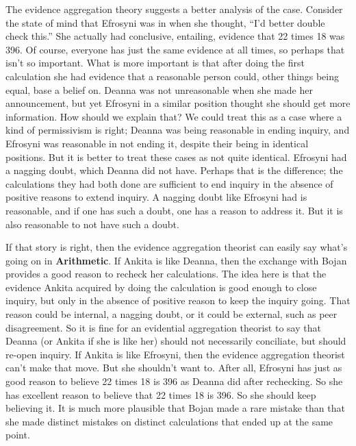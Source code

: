 The evidence aggregation theory suggests a better analysis of the case. Consider the state of mind that \gls{Efrosyni} was in when she thought, ``I'd better double check this.'' She actually had conclusive, entailing, evidence that 22 times 18 was 396. Of course, everyone has just the same evidence at all times, so perhaps that isn't so important. What is more important is that after doing the first calculation she had evidence that a reasonable person could, other things being equal, base a belief on. \gls{Deanna} was not unreasonable when she made her announcement, but yet \gls{Efrosyni} in a similar position thought she should get more information. How should we explain that? We could treat this as a case where a kind of permissivism is right; \gls{Deanna} was being reasonable in ending inquiry, and \gls{Efrosyni} was reasonable in not ending it, despite their being in identical positions. But it is better to treat these cases as not quite identical. \gls{Efrosyni} had a nagging doubt, which \gls{Deanna} did not have. Perhaps that is the difference; the calculations they had both done are sufficient to end inquiry in the absence of positive reasons to extend inquiry. A nagging doubt like \gls{Efrosyni} had is reasonable, and if one has such a doubt, one has a reason to address it. But it is also reasonable to not have such a doubt.

If that story is right, then the evidence aggregation theorist can easily say what's going on in \textbf{Arithmetic}. If \gls{Ankita} is like \gls{Deanna}, then the exchange with \gls{Bojan} provides a good reason to recheck her calculations. The idea here is that the evidence \gls{Ankita} acquired by doing the calculation is good enough to close inquiry, but only in the absence of positive reason to keep the inquiry going. That reason could be internal, a nagging doubt, or it could be external, such as peer disagreement. So it is fine for an evidential aggregation theorist to say that \gls{Deanna} (or Ankita if she is like her) should not necessarily conciliate, but should re-open inquiry. If \gls{Ankita} is like \gls{Efrosyni}, then the evidence aggregation theorist can't make that move. But she shouldn't want to. After all, \gls{Efrosyni} has just as good reason to believe 22 times 18 is 396 as \gls{Deanna} did after rechecking. So she has excellent reason to believe that 22 times 18 is 396. So she should keep believing it. It is much more plausible that \gls{Bojan} made a rare mistake than that she made distinct mistakes on distinct calculations that ended up at the same point.

